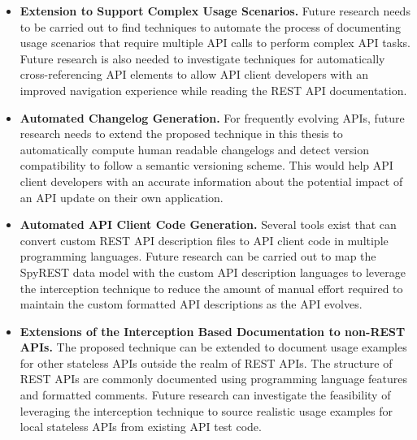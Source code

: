 \documentclass[12pt]{ucalgthes1}
\begin{document}
\begin{itemize}
  \item \textbf{Extension to Support Complex Usage Scenarios.} Future research needs to be carried out to find techniques to automate the process of documenting usage scenarios that require multiple API calls to perform complex API tasks. Future research is also needed to investigate techniques for automatically cross-referencing API elements to allow API client developers with an improved navigation experience while reading the REST API documentation.
  \item \textbf{Automated Changelog Generation.} For frequently evolving APIs, future research needs to extend the proposed technique in this thesis to automatically compute human readable changelogs and detect version compatibility to follow a semantic versioning scheme. This would help API client developers with an accurate information about the potential impact of an API update on their own application.
  \item \textbf{Automated API Client Code Generation.} Several tools exist that can convert custom REST API description files to API client code in multiple programming languages. Future research can be carried out to map the SpyREST data model with the custom API description languages to leverage the interception technique to reduce the amount of manual effort required to maintain the custom formatted API descriptions as the API evolves.
  \item \textbf{Extensions of the Interception Based Documentation to non-REST APIs.} The proposed technique can be extended to document usage examples for other stateless APIs outside the realm of REST APIs. The structure of REST APIs are commonly documented using programming language features and formatted comments. Future research can investigate the feasibility of leveraging the interception technique to source realistic usage examples for local stateless APIs from existing API test code.
\end{itemize}

\appendix

\end{document}
